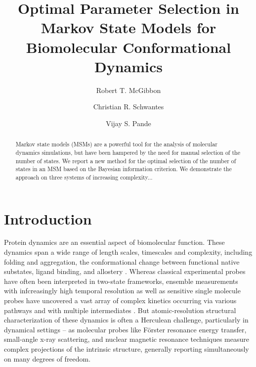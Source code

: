 \documentclass[twocolumn,floatfix,nofootinbib,aps]{revtex4-1}
\begin{document}
\title{Optimal Parameter Selection in Markov State Models for Biomolecular Conformational Dynamics}
\author{Robert T. McGibbon}
\author{Christian R. Schwantes}
\author{Vijay S. Pande}

\begin{abstract}
Markov state models (MSMs) are a powerful tool for the analysis of molecular dynamics simulations, but have been hampered by the need for manual selection of the number of states. We report a new method for the optimal selection of the number of states in an MSM based on the Bayesian information criterion. We demonstrate the approach on three systems of increasing complexity...
\end{abstract}

\maketitle

\section{Introduction}
Protein dynamics are an essential aspect of biomolecular function. These dynamics span a wide range of length scales, timescales and complexity, including folding and aggregation, the conformational change between functional native substates, ligand binding, and allostery \cite{Dobson2003Protein, Kim2008Real, Austin1975Dynamics, Bahar2007Intrinsic}. Whereas classical experimental probes have often been interpreted in two-state frameworks, ensemble measurements with infcreasingly high temporal resolution as well as sensitive single molecule probes have uncovered a vast array of complex kinetics occurring via various pathways and with multiple intermediates \cite{Cosa2006Evidence, Zhang2011Direct}. But atomic-resolution structural characterization of these dynamics is often a Herculean challenge, particularly in dynamical settings -- as molecular probes like F\"{o}rster resonance energy transfer, small-angle x-ray scattering, and nuclear magnetic resonance techniques measure complex projections of the intrinsic structure, generally reporting simultaneously on many degrees of freedom\cite{Mertens2010Structural, Tzeng2011Protein}.
\end{document}

